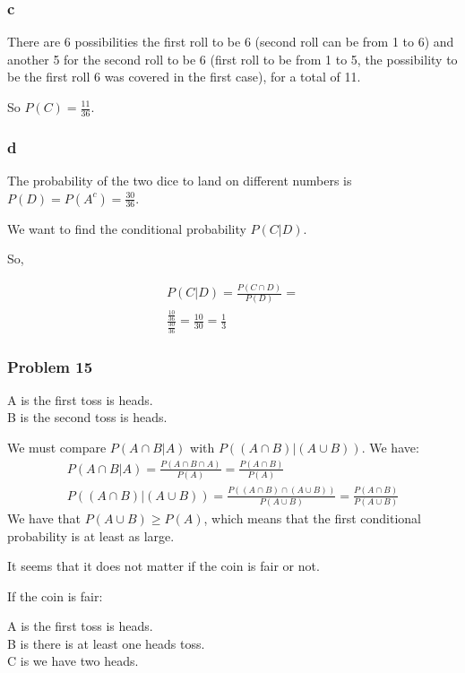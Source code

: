 \documentclass{article}
\begin{document}
\subsubsection*{c}

There are 6 possibilities the first roll to be 6 (second roll can be from 1 to 6) and another 5 for the second roll to be 6 (first roll to be from 1 to 5, the possibility to be the first roll 6 was covered in the first case), for a total of 11.

So $P(C) = \frac{11}{36}$.

\subsubsection*{d}

The probability of the two dice to land on different numbers is $P(D) = P(A^{c}) = \frac{30}{36}$.

We want to find the conditional probability $P(C | D)$.

So,

\begin{gather*}
    P(C|D) = \frac{P(C \cap D)}{P(D)} = \\
    \frac{\frac{10}{36}}{\frac{30}{36}} = \frac{10}{30} = \frac{1}{3}
\end{gather*}

\subsubsection*{Problem 15}



A is the first toss is heads. \\
B is the second toss is heads.

We must compare $P(A \cap B | A)$ with $P((A \cap B)|( A \cup B))$.
 We have:
 \begin{gather*}
    P(A \cap B | A) = \frac{P(A \cap B \cap A)}{P(A)} = \frac{P(A \cap B)}{P(A)} \\
    P((A \cap B)| (A \cup B)) = \frac{P((A \cap B) \cap (A \cup B))}{P(A \cup B)} = \frac{P(A \cap B)}{P(A \cup B)}
 \end{gather*}
We have that $P(A \cup B) \geq P(A)$, which means that the first conditional probability is at least as large.

It seems that it does not matter if the coin is fair or not. 

If the coin is fair:

A is the first toss is heads. \\
B is there is at least one heads toss. \\
C is we have two heads.
\end{document}

